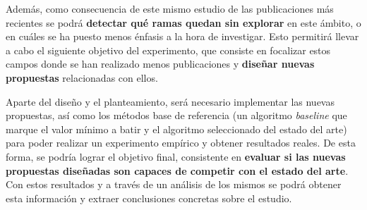 Además, como consecuencia de este mismo estudio de las publicaciones más recientes se podrá \textbf{detectar qué ramas quedan sin explorar} en este ámbito, o en cuáles se ha puesto menos énfasis a la hora de investigar. Esto permitirá llevar a cabo el siguiente objetivo del experimento, que consiste en focalizar estos campos donde se han realizado menos publicaciones y \textbf{diseñar nuevas propuestas} relacionadas con ellos.

Aparte del diseño y el planteamiento, será necesario implementar las nuevas propuestas, así como los métodos base de referencia (un algoritmo \textit{baseline} que marque el valor mínimo a batir y el algoritmo seleccionado del estado del arte) para poder realizar un experimento empírico y obtener resultados reales. De esta forma, se podría lograr el objetivo final, consistente en \textbf{evaluar si las nuevas propuestas diseñadas son capaces de competir con el estado del arte}. Con estos resultados y a través de un análisis de los mismos se podrá obtener esta información y extraer conclusiones concretas sobre el estudio.